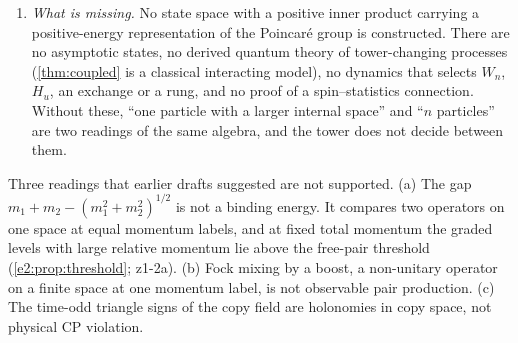 \begin{enumerate}[label=(\arabic*),leftmargin=2.2em]
Dirac spinors. Under the diagonal action none exists, and under the spectator action copy~2 carries no linear Dirac operator. No
gauge-admissible, binding-compatible field changes $N$. Within the binding-compatible algebra the number-changing directions are the
paired boosts, which are not gauge fields; outside it, compact generators and non-compact ones, the interior boosts of \cref{e2:prop:bogo}
among them, also mix sectors differing by two quanta. The Clifford exchange $\tau_K$ is not a statistics label. At $n=2$ none of the compact parts of
the five candidate gauge algebras contains the Pati--Salam algebra.
\item \emph{What is missing.} No state space with a positive inner product carrying a positive-energy representation of the Poincar\'e
group is constructed. There are no asymptotic states, no derived quantum theory of tower-changing processes (\cref{thm:coupled} is a classical
interacting model), no dynamics that selects $W_n$, $H_u$, an exchange or a rung,
and no proof of a spin--statistics connection. Without these, ``one particle with a larger internal space'' and ``$n$ particles'' are two
readings of the same algebra, and the tower does not decide between them.
\end{enumerate}

Three readings that earlier drafts suggested are not supported. (a) The gap $m_1+m_2-(m_1^2+m_2^2)^{1/2}$ is not a binding energy. It compares two
operators on one space at equal momentum labels, and at fixed total momentum the graded levels with large relative momentum lie above the
free-pair threshold (\cref{e2:prop:threshold}; z1-2a). (b) Fock mixing by a boost, a non-unitary operator on a finite space at one momentum
label, is not observable pair production. (c) The time-odd triangle signs of the copy field are holonomies in copy space, not physical CP
violation.

